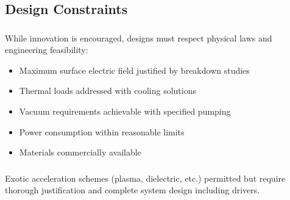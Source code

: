 \subsection{Design Constraints}

\subsubsection{}
While innovation is encouraged, designs must respect physical laws and engineering feasibility:
\begin{itemize}[noitemsep]
    \item Maximum surface electric field justified by breakdown studies
    \item Thermal loads addressed with cooling solutions
    \item Vacuum requirements achievable with specified pumping
    \item Power consumption within reasonable limits
    \item Materials commercially available
\end{itemize}

\subsubsection{}
Exotic acceleration schemes (plasma, dielectric, etc.) permitted but require thorough justification and complete system design including drivers.